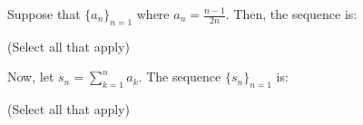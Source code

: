 \documentclass{ximera}
\author{Jim Talamo}
\begin{document}
\begin{exercise}
Suppose that $\{a_n \}_{n=1}$ where $a_n = \frac{n-1}{2n}$.  Then, the sequence is:

\begin{selectAll}
\end{selectAll}
(Select all that apply)

Now, let $s_n = \sum_{k=1}^{n} a_k$.  The sequence $\{s_n \}_{n=1}$ is:
\begin{selectAll}
\end{selectAll}
(Select all that apply)

\end{exercise}
\end{document}

